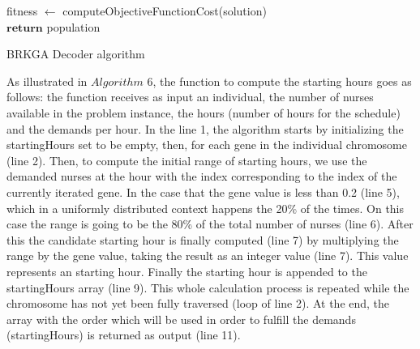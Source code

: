 \begin{algorithm}[H]


fitness $\leftarrow$ computeObjectiveFunctionCost(solution)\\
$\textbf{return}$ population
\caption{BRKGA Decoder algorithm}\label{alg.mainLoop}
\end{algorithm}

As illustrated in $Algorithm$ $6$, the function to compute the starting hours goes as follows: the function receives as input an individual, the number of nurses available in the problem instance, the hours (number of hours for the schedule) and the demands per hour. In the line 1, the algorithm starts by initializing the startingHours set to be empty, then, for each gene in the individual chromosome (line 2). Then, to compute the initial range of starting hours, we use the demanded nurses at the hour with the index corresponding to the index of the currently iterated gene. In the case that the gene value is less than 0.2 (line 5), which in a uniformly distributed context happens the 20\% of the times. On this case the range is going to be the 80\% of the total number of nurses (line 6). After this the candidate starting hour is finally computed (line 7) by multiplying the range by the gene value, taking the result as an integer value (line 7). This value represents an starting hour. Finally the starting hour is appended to the startingHours array (line 9). This whole calculation process is repeated while the chromosome has not yet been fully traversed (loop of line 2). At the end, the array with the order which will be used in order to fulfill the demands (startingHours) is returned as output (line 11).

